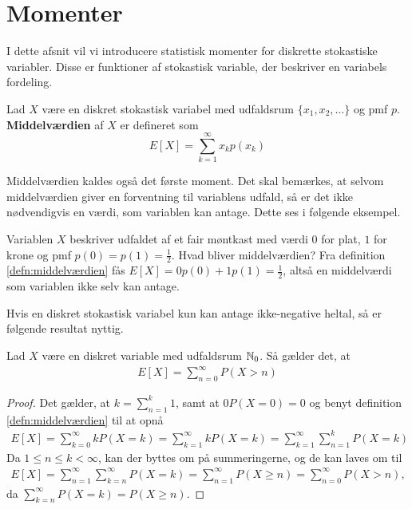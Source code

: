 \section{Momenter}
I dette afsnit vil vi introducere statistisk momenter for diskrette stokastiske variabler. Disse er funktioner af stokastisk variable, der beskriver en variabels fordeling. 

\begin{defn}\label{defn:middelværdien} %
    Lad $X$ være en diskret stokastisk variabel med udfaldsrum $\{x_1, x_2, \ldots\}$ og pmf $p$. \textbf{Middelværdien} af $X$ er defineret som
    \begin{equation*}
        E[X] = \sum^\infty_{k = 1} x_k p(x_k)
    \end{equation*}
\end{defn}
Middelværdien kaldes også det første moment.  Det skal bemærkes, at selvom middelværdien giver en forventning til variablens udfald, så er det ikke nødvendigvis en værdi, som variablen kan antage. Dette ses i følgende eksempel.

\begin{exmp}
    Variablen $X$ beskriver udfaldet af et fair møntkast med værdi $0$ for plat, $1$ for krone og pmf $p(0)=p(1)=\frac{1}{2}$. Hvad bliver middelværdien? Fra definition \ref{defn:middelværdien} fås $E[X]=0p(0)+1p(1)=\frac{1}{2}$, altså en middelværdi som variablen ikke selv kan antage.
\end{exmp}

Hvis en diskret stokastisk variabel kun kan antage ikke-negative heltal, så er følgende resultat nyttig.

\begin{prop} \label{prop:2.9}%
Lad $X$ være en diskret variable med udfaldsrum $\mathbb{N}_0$. Så gælder det, at
\begin{align*}
    E[X] = \sum^\infty_{n = 0} P(X > n)
\end{align*}
\end{prop}
\begin{proof}
    Det gælder, at $k = \sum^k_{n = 1} 1$, samt at $0P(X=0)=0$ og benyt definition \ref{defn:middelværdien} til at opnå
    \begin{align*}
        E[X] = \sum^\infty_{k = 0} k P(X = k)
        = \sum^\infty_{k = 1} k P(X = k)
        = \sum^\infty_{k = 1} \sum^k_{n = 1} P(X = k) 
\end{align*}
        Da $1\leq n \leq k < \infty$, kan der byttes om på summeringerne, og de kan laves om til
\begin{align*}
    E[X] = \sum^\infty_{n = 1} \sum^\infty_{k = n} P(X = k) = \sum^\infty_{n = 1} P(X \geq n) = \sum^\infty_{n = 0} P(X > n),
    \end{align*}
    da $\sum^\infty_{k = n} P(X = k) = P(X \geq n)$. 
\end{proof}

